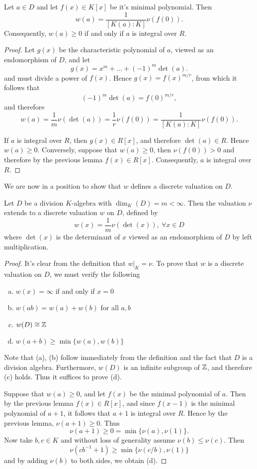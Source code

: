 \begin{lem}
Let $a\in D$ and let $f(x)\in K[x]$ be it's minimal polynomial.  Then
$$w(a) = \frac{1}{[K(a):K]} \nu(f(0)).$$
Consequently, $w(a)\geq 0$ if and only if $a$ is integral over $R$.
\end{lem}
\begin{proof}
Let $g(x)$ be the characteristic polynomial of $a$, viewed as an endomorphism of $D$, and let
$$g(x) = x^m + \dots + (-1)^m\det(a).$$
and must divide a power of $f(x)$.  Hence $g(x) = f(x)^{m/r}$, from which it follows that
$$(-1)^m\det(a) = f(0)^{m/r},$$
and therefore
$$w(a) = \frac{1}{m}\nu(\det(a)) = \frac{1}{r}\nu(f(0)) = \frac{1}{[K(a):K]}\nu(f(0)).$$

If $a$ is integral over $R$, then $g(x)\in R[x]$, and therefore $\det(a)\in R$.  Hence $w(a)\geq 0$.   Conversely, suppose that $w(a)\geq0$, then $\nu(f(0))>0$ and therefore by the previous lemma $f(x)\in R[x]$.  Consequently, $a$ is integral over $R$.
\end{proof}

We are now in a position to show that $w$ defines a discrete valuation on $D$.
\begin{thm}
Let $D$ be a division $K$-algebra with $\dim_K(D) = m<\infty$.  Then the valuation $\nu$ extends to a discrete valuation $w$ on $D$, defined by
$$w(x) = \frac{1}{m}\nu(\det(x)),\ \forall x\in D$$
where $\det(x)$ is the determinant of $x$ viewed as an endomorphism of $D$ by left multiplication.
\end{thm}
\begin{proof}
It's clear from the definition that $w|_K = \nu$.  To prove that $w$ is a discrete valuation on $D$, we must verify the following
\begin{enumerate}[(a)]
\item  $w(x) = \infty$ if and only if $x = 0$
\item  $w(ab) = w(a) + w(b)$ for all $a,b$
\item  $w(D)\cong \mathbb{Z}$
\item  $w(a+b)\geq \min\{w(a),w(b)\}$
\end{enumerate}
Note that (a), (b) follow immediately from the definition and the fact that $D$ is a division algebra.  Furthermore, $w(D)$ is an infinite subgroup of $\mathbb{Z}$, and therefore (c) holds.  Thus it suffices to prove (d).

Suppose that $w(a)\geq 0$, and let $f(x)$ be the minimal polynomial of $a$.  Then by the previous lemma $f(x)\in R[x]$, and since $f(x-1)$ is the minimal polynomial of $a+1$, it follows that $a+1$ is integral over $R$.  Hence by the previous lemma, $\nu(a +1)\geq 0$.  Thus
$$\nu(a+1) \geq 0 = \min\{\nu(a),\nu(1)\}.$$
Now take $b,c\in K$ and without loss of generality assume $\nu(b)\leq \nu(c)$.  Then
$$\nu(cb^{-1} + 1)\geq \min\{\nu(c/b),\nu(1)\}$$
and by adding $\nu(b)$ to both sides, we obtain (d).
\end{proof}

